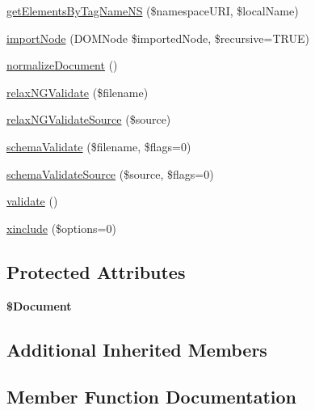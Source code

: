 \begin{DoxyCompactItemize}
\item 
\hyperlink{class_able_polecat___dom___document_abstract_af20c7be087245f946ac72533fdd31501}{get\+Elements\+By\+Tag\+Name\+N\+S} (\$namespace\+U\+R\+I, \$local\+Name)
\item 
\hyperlink{class_able_polecat___dom___document_abstract_a9d4357accf2f59eb78c36f7d2cfc254b}{import\+Node} (D\+O\+M\+Node \$imported\+Node, \$recursive=T\+R\+U\+E)
\item 
\hyperlink{class_able_polecat___dom___document_abstract_a74423abfbd25dfd20d7d2278e5ddae40}{normalize\+Document} ()
\item 
\hyperlink{class_able_polecat___dom___document_abstract_ab9ad7a19d83b5bda1418a3c5eabe1bc2}{relax\+N\+G\+Validate} (\$filename)
\item 
\hyperlink{class_able_polecat___dom___document_abstract_a230832c86e1d5646515b7c1565477bac}{relax\+N\+G\+Validate\+Source} (\$source)
\item 
\hyperlink{class_able_polecat___dom___document_abstract_a86f7eb82d725a553ab5c51b6116a1752}{schema\+Validate} (\$filename, \$flags=0)
\item 
\hyperlink{class_able_polecat___dom___document_abstract_af62111546c069afb59029ab0fe522607}{schema\+Validate\+Source} (\$source, \$flags=0)
\item 
\hyperlink{class_able_polecat___dom___document_abstract_a184909dab34698899937d810a9f5d393}{validate} ()
\item 
\hyperlink{class_able_polecat___dom___document_abstract_a3d0818bb6eda112a1b359cc41b40b2a9}{xinclude} (\$options=0)
\end{DoxyCompactItemize}
\subsection*{Protected Attributes}
\begin{DoxyCompactItemize}
\item 
\hypertarget{class_able_polecat___dom___document_abstract_a2a66d0352e4aaafcdfdb9c6560bcc334}{}{\bfseries \$\+Document}\label{class_able_polecat___dom___document_abstract_a2a66d0352e4aaafcdfdb9c6560bcc334}

\end{DoxyCompactItemize}
\subsection*{Additional Inherited Members}


\subsection{Member Function Documentation}
\hypertarget{class_able_polecat___dom___document_abstract_a95a8661ef9b03ce670a3b193d459a667}{}
